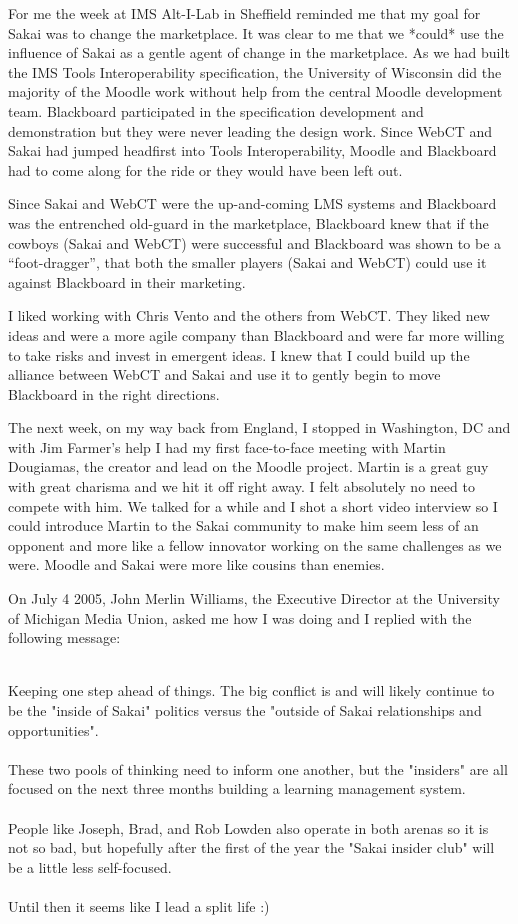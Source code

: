 \documentclass[12pt]{book}
\begin{document}
For me the week at IMS Alt-I-Lab in Sheffield reminded me that
my goal for Sakai was to change the marketplace.  It
was clear to me that we *could* use the influence of Sakai
as a gentle agent of change in the marketplace.  As we had built
the IMS
Tools Interoperability specification, the University of Wisconsin did the
majority of the
Moodle work without help from the central Moodle development
team.
Blackboard participated in the specification development
and demonstration but they were never leading the design work.
Since WebCT and Sakai had jumped headfirst into
Tools Interoperability, Moodle and Blackboard had to
come along for the ride or they would have been left out.

Since Sakai and WebCT were the up-and-coming LMS systems
and Blackboard was the entrenched old-guard in the marketplace,
Blackboard knew that if the cowboys (Sakai and WebCT) were
successful and Blackboard was shown to be a ``foot-dragger'', that
both the smaller players (Sakai and WebCT) could use it
against Blackboard in their marketing.

I liked working with Chris Vento and the others from
WebCT.  They liked new ideas and were a more
agile company than Blackboard and were far more willing to
take risks and invest in emergent
ideas.  I knew that I could build up the alliance between WebCT
and Sakai and use it to gently begin to move Blackboard in the
right directions.

The next week, on my way back from England, I stopped in
Washington, DC and with Jim Farmer's help I had my first
face-to-face meeting with Martin Dougiamas, the creator and
lead on the Moodle project.  Martin is a great guy with
great charisma and we hit it off right away.  I felt
absolutely no need to compete with him.  We talked for a while
and I shot a short video interview so I could introduce
Martin to the Sakai community to make him seem less
of an opponent and more like a fellow innovator working on the same
challenges as we were.   Moodle and Sakai were more like cousins
than enemies.

On July 4 2005, John Merlin Williams, the Executive
Director at the University of Michigan Media Union, asked me how
I was doing and I replied with the following message:\\
\\
\begin{sf}
Keeping one step ahead of things.  The big conflict is and
will likely continue to be the "inside of Sakai" politics
versus the "outside of Sakai relationships and opportunities".\\
\\
These two pools of thinking need to inform one another,
but the "insiders" are all focused on the next three
months building a learning management system.\\
\\
People like Joseph, Brad, and Rob Lowden also operate in
both arenas so it is not so bad, but hopefully after the
first of the year the "Sakai insider club" will be a
little less self-focused.\\
\\
Until then it seems like I lead a split life :)\\
\end{sf}
\end{document}
